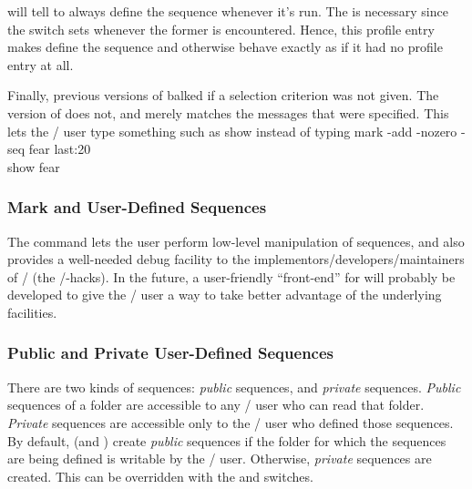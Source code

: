 will tell  to always define the sequence  whenever
it's run.
The  is necessary since the  switch sets
whenever the former is encountered.
Hence, this profile entry makes  define the 
sequence and otherwise behave exactly as if it had no profile entry at all.
\par
Finally,
previous versions of  balked if a selection criterion was not given.
The  version of  does not, and merely matches the messages that
were specified.
This lets the \MH/ user type something such as
\example show \endexample
instead of typing
\example
    mark -add -nozero -seq fear last:20\\
    show fear%
\endexample
\subsubsection{Mark and User-Defined Sequences}
The  command lets the user perform low-level manipulation of
sequences,
and also provides a well-needed debug facility to the
implementors/developers/maintainers of \MH/ (the \MH/-hacks).
In the future, a user-friendly ``front-end'' for  will
probably be developed to give the \MH/ user a way to take better
advantage of the underlying facilities.
\subsubsection{Public and Private User-Defined Sequences}
There are two kinds of sequences: {\it public\/} sequences,
and {\it private\/} sequences.
{\it Public\/} sequences of a folder are accessible to any \MH/ user who
can read that folder.
{\it Private\/} sequences are accessible only to the \MH/ user who defined
those sequences.
By default,
 (and ) create {\it public\/} sequences
if the folder for which the sequences are being defined is writable by the
\MH/ user.
Otherwise, {\it private\/} sequences are created.
This can be overridden with the  and  switches.
